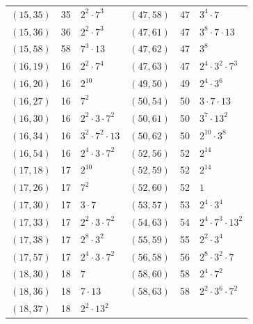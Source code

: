 \documentclass[11pt]{article}
\begin{document}
\begin{longtable}{@{}lrl@{\qquad}lrl@{}}
$(15,35)$ & 35 & $2^{2}\cdot 7^{3}$ & $(47,58)$ & 47 & $3^{4}\cdot 7$\\
$(15,36)$ & 36 & $2^{2}\cdot 7^{3}$ & $(47,61)$ & 47 & $3^{8}\cdot 7\cdot 13$\\
$(15,58)$ & 58 & $7^{3}\cdot 13$ & $(47,62)$ & 47 & $3^{8}$\\
$(16,19)$ & 16 & $2^{2}\cdot 7^{4}$ & $(47,63)$ & 47 & $2^{4}\cdot 3^{2}\cdot 7^{3}$\\
$(16,20)$ & 16 & $2^{10}$ & $(49,50)$ & 49 & $2^{4}\cdot 3^{6}$\\
$(16,27)$ & 16 & $7^{2}$ & $(50,54)$ & 50 & $3\cdot 7\cdot 13$\\
$(16,30)$ & 16 & $2^{2}\cdot 3\cdot 7^{2}$ & $(50,61)$ & 50 & $3^{7}\cdot 13^{2}$\\
$(16,34)$ & 16 & $3^{2}\cdot 7^{2}\cdot 13$ & $(50,62)$ & 50 & $2^{10}\cdot 3^{8}$\\
$(16,54)$ & 16 & $2^{4}\cdot 3\cdot 7^{2}$ & $(52,56)$ & 52 & $2^{14}$\\
$(17,18)$ & 17 & $2^{10}$ & $(52,59)$ & 52 & $2^{14}$\\
$(17,26)$ & 17 & $7^{2}$ & $(52,60)$ & 52 & $1$\\
$(17,30)$ & 17 & $3\cdot 7$ & $(53,57)$ & 53 & $2^{4}\cdot 3^{4}$\\
$(17,33)$ & 17 & $2^{2}\cdot 3\cdot 7^{2}$ & $(54,63)$ & 54 & $2^{4}\cdot 7^{3}\cdot 13^{2}$\\
$(17,38)$ & 17 & $2^{8}\cdot 3^{2}$ & $(55,59)$ & 55 & $2^{2}\cdot 3^{4}$\\
$(17,57)$ & 17 & $2^{4}\cdot 3\cdot 7^{2}$ & $(56,58)$ & 56 & $2^{8}\cdot 3^{2}\cdot 7$\\
$(18,30)$ & 18 & $7$ & $(58,60)$ & 58 & $2^{4}\cdot 7^{2}$\\
$(18,36)$ & 18 & $7\cdot 13$ & $(58,63)$ & 58 & $2^{2}\cdot 3^{6}\cdot 7^{2}$\\
$(18,37)$ & 18 & $2^{2}\cdot 13^{2}$ & & &\\
\end{longtable}
\endgroup
\end{document}
